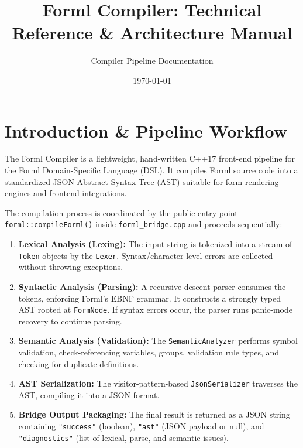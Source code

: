 \documentclass[10pt,a4paper]{article}
\title{\textbf{Forml Compiler: Technical Reference \& Architecture Manual}}
\author{Compiler Pipeline Documentation}
\date{\today}
\begin{document}
\maketitle

\section{Introduction \& Pipeline Workflow}
The Forml Compiler is a lightweight, hand-written C++17 front-end pipeline for the Forml Domain-Specific Language (DSL). It compiles Forml source code into a standardized JSON Abstract Syntax Tree (AST) suitable for form rendering engines and frontend integrations.

The compilation process is coordinated by the public entry point \texttt{forml::compileForml()} inside \texttt{forml\_bridge.cpp} and proceeds sequentially:

\begin{enumerate}[leftmargin=*]
  \item \textbf{Lexical Analysis (Lexing):} The input string is tokenized into a stream of \texttt{Token} objects by the \texttt{Lexer}. Syntax/character-level errors are collected without throwing exceptions.
  \item \textbf{Syntactic Analysis (Parsing):} A recursive-descent parser consumes the tokens, enforcing Forml's EBNF grammar. It constructs a strongly typed AST rooted at \texttt{FormNode}. If syntax errors occur, the parser runs panic-mode recovery to continue parsing.
  \item \textbf{Semantic Analysis (Validation):} The \texttt{SemanticAnalyzer} performs symbol validation, check-referencing variables, groups, validation rule types, and checking for duplicate definitions.
  \item \textbf{AST Serialization:} The visitor-pattern-based \texttt{JsonSerializer} traverses the AST, compiling it into a JSON format.
  \item \textbf{Bridge Output Packaging:} The final result is returned as a JSON string containing \texttt{"success"} (boolean), \texttt{"ast"} (JSON payload or null), and \texttt{"diagnostics"} (list of lexical, parse, and semantic issues).
\end{enumerate}
\end{document}
